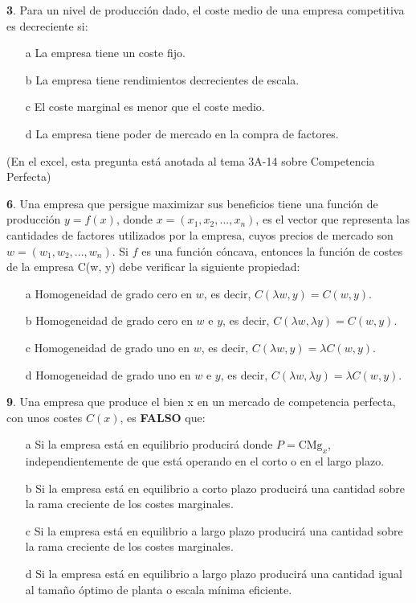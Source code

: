 \documentclass{nuevotema}
\begin{document}

\textbf{3}. Para un nivel de producción dado, el coste medio de una empresa competitiva es decreciente si:

\begin{enumerate}
	\item[a] La empresa tiene un coste fijo.
	\item[b] La empresa tiene rendimientos decrecientes de escala.
	\item[c] El coste marginal es menor que el coste medio.
	\item[d] La empresa tiene poder de mercado en la compra de factores.
\end{enumerate}


(En el excel, esta pregunta está anotada al tema 3A-14 sobre Competencia Perfecta)

\textbf{6}. Una empresa que persigue maximizar sus beneficios tiene una función de producción $y=f(x)$, donde $x=(x_1, x_2, ..., x_n)$, es el vector que representa las cantidades de factores utilizados por la empresa, cuyos precios de mercado son $w=(w_1, w_2, ..., w_n)$. Si $f$ es una función cóncava, entonces la función de costes de la empresa C(w, y) debe verificar la siguiente propiedad:

\begin{enumerate}
	\item[a] Homogeneidad de grado cero en $w$, es decir, $C(\lambda w, y) = C(w,y)$.
	\item[b] Homogeneidad de grado cero en $w$ e $y$, es decir, $C(\lambda w, \lambda y)= C(w, y)$.
	\item[c] Homogeneidad de grado uno en $w$, es decir, $C(\lambda w, y) = \lambda C(w, y)$.
	\item[d] Homogeneidad de grado uno en $w$ e $y$, es decir, $C(\lambda w, \lambda y) = \lambda C(w, y)$.
\end{enumerate}


\textbf{9}. Una empresa que produce el bien x en un mercado de competencia perfecta, con unos costes $C(x)$, es \textbf{FALSO} que:

\begin{enumerate}
	\item[a] Si la empresa está en equilibrio producirá donde $P=\text{CMg}_x$, independientemente de que está operando en el corto o en el largo plazo.
	\item[b] Si la empresa está en equilibrio a corto plazo producirá una cantidad sobre la rama creciente de los costes marginales.
	\item[c] Si la empresa está en equilibrio a largo plazo producirá una cantidad sobre la rama creciente de los costes marginales.
	\item[d] Si la empresa está en equilibrio a largo plazo producirá una cantidad igual al tamaño óptimo de planta o escala mínima eficiente.
\end{enumerate}
\end{document}
